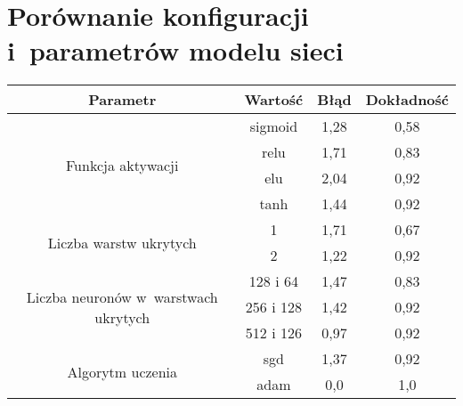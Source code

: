 \chapter{Porównanie konfiguracji i~parametrów modelu sieci}
\label{ch:nn_comparison_table}

\begin{table}[!h]
\centering
\begin{tabular}{c|c|c|c}
\toprule
Parametr                                              & Wartość   & Błąd & Dokładność \\
\midrule
\multirow{4}{*}{Funkcja aktywacji}                    & sigmoid   & 1,28 & 0,58       \\
                                                      & relu      & 1,71 & 0,83       \\
                                                      & elu       & 2,04 & 0,92       \\
                                                      & tanh      & 1,44 & 0,92       \\
\midrule
\multirow{2}{*}{Liczba warstw ukrytych}               & 1         & 1,71 & 0,67       \\
                                                      & 2         & 1,22 & 0,92       \\
\midrule                                                     
\multirow{3}{*}{\parbox{5cm}
{\centering Liczba neuronów w~warstwach ukrytych}}     & 128 i 64  & 1,47 & 0,83       \\
                                                      & 256 i 128 & 1,42 & 0,92       \\
                                                      & 512 i 126 & 0,97 & 0,92       \\
\midrule
\multirow{2}{*}{Algorytm uczenia}                     & sgd       & 1,37 & 0,92       \\
                                                      & adam      & 0,0  & 1,0        \\
\bottomrule
\end{tabular}
\end{table}